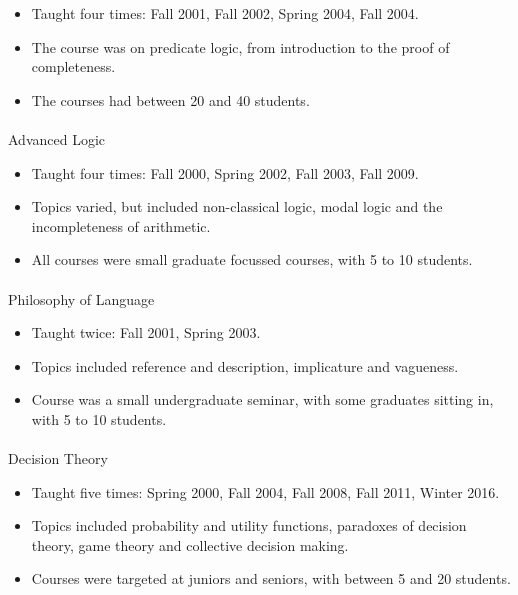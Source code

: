 \documentclass[
  10pt,
  letterpaper,
  DIV=11,
  numbers=noendperiod,
  twoside]{scrartcl}
\makeatletter
\let\oldparagraph\paragraph
\renewcommand{\paragraph}{
    \@ifstar
      \xxxParagraphStar
      \xxxParagraphNoStar
  }
\newcommand{\xxxParagraphStar}[1]{\oldparagraph*{#1}\mbox{}}
\newcommand{\xxxParagraphNoStar}[1]{\oldparagraph{#1}\mbox{}}
\providecommand{\tightlist}{%
  \setlength{\itemsep}{0pt}\setlength{\parskip}{0pt}}\usepackage{longtable,booktabs,array}
\makeatother
\begin{document}
\begin{itemize}
\tightlist
\item
  Taught four times: Fall 2001, Fall 2002, Spring 2004, Fall 2004.
\item
  The course was on predicate logic, from introduction to the proof of
  completeness.
\item
  The courses had between 20 and 40 students.
\end{itemize}

\paragraph{Advanced Logic}\label{advanced-logic}

\begin{itemize}
\tightlist
\item
  Taught four times: Fall 2000, Spring 2002, Fall 2003, Fall 2009.
\item
  Topics varied, but included non-classical logic, modal logic and the
  incompleteness of arithmetic.
\item
  All courses were small graduate focussed courses, with 5 to 10
  students.
\end{itemize}

\paragraph{Philosophy of Language}\label{philosophy-of-language}

\begin{itemize}
\tightlist
\item
  Taught twice: Fall 2001, Spring 2003.
\item
  Topics included reference and description, implicature and vagueness.
\item
  Course was a small undergraduate seminar, with some graduates sitting
  in, with 5 to 10 students.
\end{itemize}

\paragraph{Decision Theory}\label{decision-theory}

\begin{itemize}
\tightlist
\item
  Taught five times: Spring 2000, Fall 2004, Fall 2008, Fall 2011,
  Winter 2016.
\item
  Topics included probability and utility functions, paradoxes of
  decision theory, game theory and collective decision making.
\item
  Courses were targeted at juniors and seniors, with between 5 and 20
  students.
\end{itemize}
\end{document}
